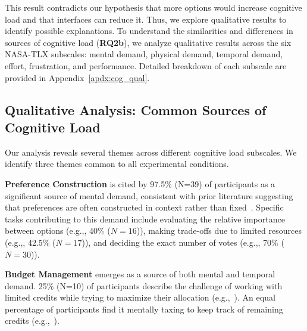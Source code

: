 This result contradicts our hypothesis that more options would increase cognitive load and that interfaces can reduce it. Thus, we explore qualitative results to identify possible explanations. To understand the similarities and differences in sources of cognitive load (\textbf{RQ2b}), we analyze qualitative results across the six NASA-TLX subscales: mental demand, physical demand, temporal demand, effort, frustration, and performance. Detailed breakdown of each subscale are provided in Appendix~\ref{apdx:cog_qual}.

\subsection{Qualitative Analysis: Common Sources of Cognitive Load}
\label{sec:cog_common}
Our analysis reveals several themes across different cognitive load subscales. We identify three themes common to all experimental conditions.

\textbf{Preference Construction} is cited by 97.5\% (N=39) of participants as a significant source of mental demand, consistent with prior literature suggesting that preferences are often constructed in context rather than fixed~\cite{lichtensteinConstructionPreference2006}. Specific tasks contributing to this demand include evaluating the relative importance between options (e.g.,, 40\% ($N=16$)), making trade-offs due to limited resources (e.g.,, 42.5\% ($N=17$)), and deciding the exact number of votes (e.g.,, 70\% ($N=30$)).

\textbf{Budget Management} emerges as a source of both mental and temporal demand. 25\% (N=10) of participants describe the challenge of working with limited credits while trying to maximize their allocation (e.g.,~). An equal percentage of participants find it mentally taxing to keep track of remaining credits (e.g.,~).

